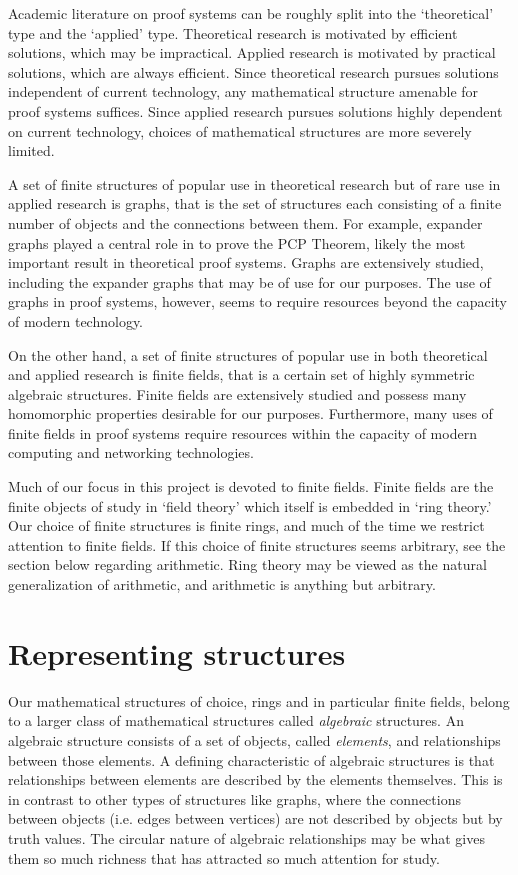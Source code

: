Academic literature on proof systems can be roughly split into the `theoretical' type and the `applied' type.
Theoretical research is motivated by efficient solutions, which may be impractical.
Applied research is motivated by practical solutions, which are always efficient.
Since theoretical research pursues solutions independent of current technology, any mathematical structure amenable for proof systems suffices.
Since applied research pursues solutions highly dependent on current technology, choices of mathematical structures are more severely limited.

A set of finite structures of popular use in theoretical research but of rare use in applied research is graphs, that is the set of structures each consisting of a finite number of objects and the connections between them.
For example, expander graphs played a central role in \cite{Din07} to prove the PCP Theorem, likely the most important result in theoretical proof systems.
Graphs are extensively studied, including the expander graphs that may be of use for our purposes.
The use of graphs in proof systems, however, seems to require resources beyond the capacity of modern technology.

On the other hand, a set of finite structures of popular use in both theoretical and applied research is finite fields, that is a certain set of highly symmetric algebraic structures.
Finite fields are extensively studied and possess many homomorphic properties desirable for our purposes.
Furthermore, many uses of finite fields in proof systems require resources within the capacity of modern computing and networking technologies.

Much of our focus in this project is devoted to finite fields.
Finite fields are the finite objects of study in `field theory' which itself is embedded in `ring theory.'
Our choice of finite structures is finite rings, and much of the time we restrict attention to finite fields.
If this choice of finite structures seems arbitrary, see the section below regarding arithmetic.
Ring theory may be viewed as the natural generalization of arithmetic, and arithmetic is anything but arbitrary.


\section{Representing structures}

Our mathematical structures of choice, rings and in particular finite fields, belong to a larger class of mathematical structures called \emph{algebraic} structures. 
An algebraic structure consists of a set of objects, called \emph{elements}, and relationships between those elements.
A defining characteristic of algebraic structures is that relationships between elements are described by the elements themselves. 
This is in contrast to other types of structures like graphs, where the connections between objects (i.e. edges between vertices) are not described by objects but by truth values.
The circular nature of algebraic relationships may be what gives them so much richness that has attracted so much attention for study.

